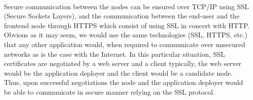 \documentclass[11pt]{amsart}
\begin{document}
\begin{enumarate}
          \\ Secure communication between the nodes can be ensured over TCP/IP using SSL
          (Secure Sockets Layers), and the communication between the end-user and the
          frontend node through HTTPS which consist of using SSL in concert with
          HTTP. Obvious as it may seem, we would use the same technologies (SSL, HTTPS,
          etc.) that any other application would, when required to communicate over
          unsecured networks as is the case with the Internet. In this particular
          situation, SSL certificates are negotiated by a web server and a client
          typically, the web server would be the application deployer and the client would
          be a candidate node. Thus, upon successful negotiations the node and the
          application deployer would be able to communicate in secure manner relying on
          the SSL protocol.
          

\end{enumarate}
\end{document}

